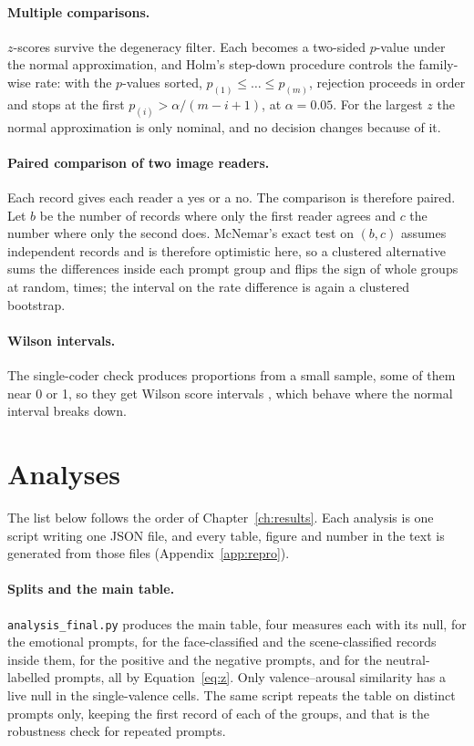 \paragraph{Multiple comparisons.} \HolmM{} $z$-scores survive the degeneracy filter. Each becomes a two-sided $p$-value under the normal approximation, and Holm's step-down procedure \cite{holm1979simple} controls the family-wise rate: with the $p$-values sorted, $p_{(1)} \le \dots \le p_{(m)}$, rejection proceeds in order and stops at the first $p_{(i)} > \alpha / (m - i + 1)$, at $\alpha = 0.05$. For the largest $z$ the normal approximation is only nominal, and no decision changes because of it.

\paragraph{Paired comparison of two image readers.} Each record gives each reader a yes or a no. The comparison is therefore paired. Let $b$ be the number of records where only the first reader agrees and $c$ the number where only the second does. McNemar's exact test \cite{mcnemar1947note} on $(b, c)$ assumes independent records and is therefore optimistic here, so a clustered alternative sums the differences inside each prompt group and flips the sign of whole groups at random, \McClusterDraws{} times; the interval on the rate difference is again a clustered bootstrap.

\paragraph{Wilson intervals.} The single-coder check produces proportions from a small sample, some of them near 0 or 1, so they get Wilson score intervals \cite{wilson1927probable}, which behave where the normal interval breaks down.

\section{Analyses}
\label{sec:method-analyses}

The list below follows the order of Chapter~\ref{ch:results}. Each analysis is one script writing one JSON file, and every table, figure and number in the text is generated from those files (Appendix~\ref{app:repro}).

\paragraph{Splits and the main table.} \texttt{analysis\_final.py} produces the main table, four measures each with its null, for the emotional prompts, for the face-classified and the scene-classified records inside them, for the positive and the negative prompts, and for the neutral-labelled prompts, all by Equation~\ref{eq:z}. Only valence--arousal similarity has a live null in the single-valence cells. The same script repeats the table on distinct prompts only, keeping the first record of each of the \nDistinct{} groups, and that is the robustness check for repeated prompts.

